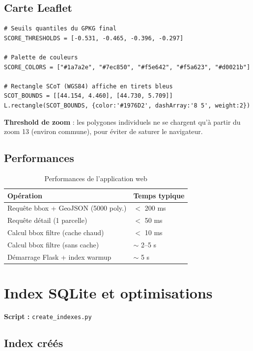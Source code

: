 \documentclass[12pt,a4paper]{report}
\newcommand{\code}[1]{\texttt{\small #1}}
\begin{document}
\subsection{Carte Leaflet}

\begin{lstlisting}[language=Python3, caption={Seuils de score et couleurs (app\_carte2.py)}]
# Seuils quantiles du GPKG final
SCORE_THRESHOLDS = [-0.531, -0.465, -0.396, -0.297]

# Palette de couleurs
SCORE_COLORS = ["#1a7a2e", "#7ec850", "#f5e642", "#f5a623", "#d0021b"]

# Rectangle SCoT (WGS84) affiche en tirets bleus
SCOT_BOUNDS = [[44.154, 4.460], [44.730, 5.709]]
L.rectangle(SCOT_BOUNDS, {color:'#1976D2', dashArray:'8 5', weight:2})
\end{lstlisting}

\textbf{Threshold de zoom} : les polygones individuels ne se chargent qu'à partir du zoom 13 (environ commune), pour éviter de saturer le navigateur.

\subsection{Performances}

\begin{table}[H]
\centering
\begin{tabular}{ll}
\toprule
\textbf{Opération} & \textbf{Temps typique} \\
\midrule
Requête bbox + GeoJSON (5000 poly.) & $<$ 200 ms \\
Requête détail (1 parcelle) & $<$ 50 ms \\
Calcul bbox filtre (cache chaud) & $<$ 10 ms \\
Calcul bbox filtre (sans cache) & $\sim$ 2–5 s \\
Démarrage Flask + index warmup & $\sim$ 5 s \\
\bottomrule
\end{tabular}
\caption{Performances de l'application web}
\end{table}

\section{Index SQLite et optimisations}

\textbf{Script :} \code{create\_indexes.py}

\subsection{Index créés}
\end{document}
